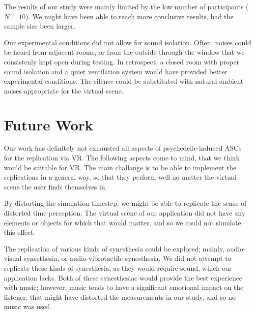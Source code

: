 The results of our study were mainly limited by the low number of participants ($N=10$). We might have been able to reach more conclusive results, had the sample size been larger.

Our experimental conditions did not allow for sound isolation. Often, noises could be heard from adjacent rooms, or from the outside through the window that we consistenly kept open during testing. In retrospect, a closed room with proper sound isolation and a quiet ventilation system would have provided better experimental conditions. The silence could be substituted with natural ambient noises appropriate for the virtual scene.

\section{Future Work}
Our work has definitely not exhausted all aspects of psychedelic-induced \acp{ASC} for the replication via \ac{VR}. The following aspects come to mind, that we think would be suitable for \ac{VR}. The main challange is to be able to implement the replications in a general way, so that they perform well no matter the virtual scene the user finds themselves in.

By distorting the simulation timestep, we might be able to replicate the sense of distorted time perception. The virtual scene of our application did not have any elements or objects for which that would matter, and so we could not simulate this effect.

The replication of various kinds of synesthesia could be explored; mainly, audio-visual synesthesia, or audio-vibrotactile synesthesia. We did not attempt to replicate these kinds of synesthesia, as they would require sound, which our application lacks. Both of these synesthesiae would provide the best experience with music; however, music tends to have a significant emotional impact on the listener, that might have distorted the measurements in our study, and so no music was used.


